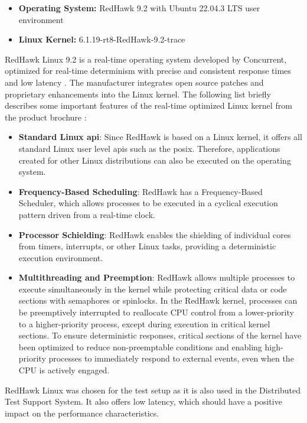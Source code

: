 \begin{itemize}
\item \textbf{Operating System:} RedHawk 9.2 with Ubuntu 22.04.3 LTS user environment
\item \textbf{Linux Kernel:} 6.1.19-rt8-RedHawk-9.2-trace
\end{itemize}

RedHawk Linux 9.2 is a real-time operating system developed by Concurrent, optimized for real-time determinism with precise and consistent response times and low latency \cite{swsetup01}. The manufacturer integrates open source patches and proprietary enhancements into the Linux kernel. The following list briefly describes some important features of the real-time optimized Linux kernel from the product brochure \cite{swsetup02}:

\begin{itemize}
\item \textbf{Standard Linux \ac{api}}: Since RedHawk is based on a Linux kernel, it offers all standard Linux user level \ac{api}s such as the \ac{posix}. Therefore, applications created for other Linux distributions can also be executed on the operating system.
\item \textbf{Frequency-Based Scheduling}: RedHawk has a Frequency-Based Scheduler, which allows processes to be executed in a cyclical execution pattern driven from a real-time clock.
\item \textbf{Processor Schielding}: RedHawk enables the shielding of individual cores from timers, interrupts, or other Linux tasks, providing a deterministic execution environment.
\item \textbf{Multithreading and Preemption}: RedHawk allows multiple processes to execute simultaneously in the kernel while protecting critical data or code sections with semaphores or spinlocks. In the RedHawk kernel, processes can be preemptively interrupted to reallocate \ac{CPU} control from a lower-priority to a higher-priority process, except during execution in critical kernel sections. To ensure deterministic responses, critical sections of the kernel have been optimized to reduce non-preemptable conditions and enabling high-priority processes to immediately respond to external events, even when the \ac{CPU} is actively engaged.
\end{itemize}

RedHawk Linux was chosen for the test setup as it is also used in the Distributed Test Support System. It also offers low latency, which should have a positive impact on the performance characteristics.

